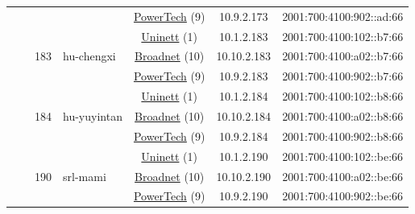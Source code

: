 \begin{small}
\begin{center}
\begin{longtable}{|c|c|c|c|c|c|c|c|}
  &  &  &  & \multicolumn{2}{|c|}{\tiny{\href{http://www.powertech.no}{PowerTech} (9)}} & \tiny{10.9.2.173} & \tiny{2001:700:4100:902::ad:66} \\* \cline{3-3}\cline{4-4}\cline{5-5}\cline{6-6}\cline{7-7}\cline{8-8}
  &  & \multirow{3}{*}{\tiny{183}} & \multicolumn{1}{|l|}{\multirow{3}{*}{\tiny{hu-chengxi}}} & \multicolumn{2}{|c|}{\tiny{\href{https://www.uninett.no}{Uninett} (1)}} & \tiny{10.1.2.183} & \tiny{2001:700:4100:102::b7:66} \\* \cline{5-5}\cline{6-6}\cline{7-7}\cline{8-8}
  &  &  &  & \multicolumn{2}{|c|}{\tiny{\href{https://www.broadnet.no}{Broadnet} (10)}} & \tiny{10.10.2.183} & \tiny{2001:700:4100:a02::b7:66} \\* \cline{5-5}\cline{6-6}\cline{7-7}\cline{8-8}
  &  &  &  & \multicolumn{2}{|c|}{\tiny{\href{http://www.powertech.no}{PowerTech} (9)}} & \tiny{10.9.2.183} & \tiny{2001:700:4100:902::b7:66} \\* \cline{3-3}\cline{4-4}\cline{5-5}\cline{6-6}\cline{7-7}\cline{8-8}
  &  & \multirow{3}{*}{\tiny{184}} & \multicolumn{1}{|l|}{\multirow{3}{*}{\tiny{hu-yuyintan}}} & \multicolumn{2}{|c|}{\tiny{\href{https://www.uninett.no}{Uninett} (1)}} & \tiny{10.1.2.184} & \tiny{2001:700:4100:102::b8:66} \\* \cline{5-5}\cline{6-6}\cline{7-7}\cline{8-8}
  &  &  &  & \multicolumn{2}{|c|}{\tiny{\href{https://www.broadnet.no}{Broadnet} (10)}} & \tiny{10.10.2.184} & \tiny{2001:700:4100:a02::b8:66} \\* \cline{5-5}\cline{6-6}\cline{7-7}\cline{8-8}
  &  &  &  & \multicolumn{2}{|c|}{\tiny{\href{http://www.powertech.no}{PowerTech} (9)}} & \tiny{10.9.2.184} & \tiny{2001:700:4100:902::b8:66} \\* \cline{3-3}\cline{4-4}\cline{5-5}\cline{6-6}\cline{7-7}\cline{8-8}
  &  & \multirow{3}{*}{\tiny{190}} & \multicolumn{1}{|l|}{\multirow{3}{*}{\tiny{srl-mami}}} & \multicolumn{2}{|c|}{\tiny{\href{https://www.uninett.no}{Uninett} (1)}} & \tiny{10.1.2.190} & \tiny{2001:700:4100:102::be:66} \\* \cline{5-5}\cline{6-6}\cline{7-7}\cline{8-8}
  &  &  &  & \multicolumn{2}{|c|}{\tiny{\href{https://www.broadnet.no}{Broadnet} (10)}} & \tiny{10.10.2.190} & \tiny{2001:700:4100:a02::be:66} \\* \cline{5-5}\cline{6-6}\cline{7-7}\cline{8-8}
  &  &  &  & \multicolumn{2}{|c|}{\tiny{\href{http://www.powertech.no}{PowerTech} (9)}} & \tiny{10.9.2.190} & \tiny{2001:700:4100:902::be:66} \\* \cline{3-3}\cline{4-4}\cline{5-5}\cline{6-6}\cline{7-7}\cline{8-8}

\end{longtable}
\end{center}
\end{small}
